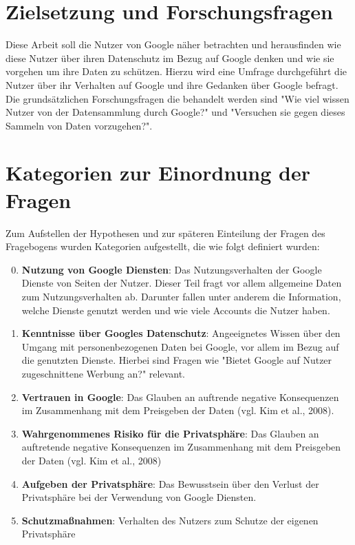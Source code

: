 \section{Zielsetzung und Forschungsfragen}
Diese Arbeit soll die Nutzer von Google näher betrachten und herausfinden wie diese Nutzer über ihren Datenschutz im Bezug auf Google denken und wie sie vorgehen um ihre Daten zu schützen. Hierzu wird eine Umfrage durchgeführt die Nutzer über ihr Verhalten auf Google und ihre Gedanken über Google befragt.
Die grundsätzlichen Forschungsfragen die behandelt werden sind "Wie viel wissen Nutzer von der Datensammlung durch Google?" und "Versuchen sie gegen dieses Sammeln von Daten vorzugehen?". 

\section{Kategorien zur Einordnung der Fragen}
\label{sec:categories}
Zum Aufstellen der Hypothesen und zur späteren Einteilung der Fragen des Fragebogens wurden Kategorien aufgestellt, die wie folgt definiert wurden:
\begin{enumerate}
\setcounter{enumi}{-1}
\item \label{Kat0}\textbf{Nutzung von Google Diensten}: Das Nutzungsverhalten der Google Dienste von Seiten der Nutzer. Dieser Teil fragt vor allem allgemeine Daten zum Nutzungsverhalten ab. Darunter fallen unter anderem die Information, welche Dienste genutzt werden und wie viele Accounts die Nutzer haben.
\item \label{Kat1}\textbf{Kenntnisse über Googles Datenschutz}: Angeeignetes Wissen über den Umgang mit personenbezogenen Daten bei Google, vor allem im Bezug auf die genutzten Dienste. Hierbei sind Fragen wie "Bietet Google auf Nutzer zugeschnittene Werbung an?" relevant.
\item \label{Kat2}\textbf{Vertrauen in Google}: Das Glauben an auftrende negative Konsequenzen im Zusammenhang mit dem Preisgeben der Daten (vgl. Kim et al., 2008).
\item \label{Kat3}\textbf{Wahrgenommenes Risiko für die Privatsphäre}: Das Glauben an auftretende negative Konsequenzen im Zusammenhang mit dem Preisgeben der Daten (vgl. Kim et al., 2008)
\item \label{Kat4}\textbf{Aufgeben der Privatsphäre}: Das Bewusstsein über den Verlust der Privatsphäre bei der Verwendung von Google Diensten.
\item \label{Kat5}\textbf{Schutzmaßnahmen}: Verhalten des Nutzers zum Schutze der eigenen Privatsphäre
\end{enumerate}

